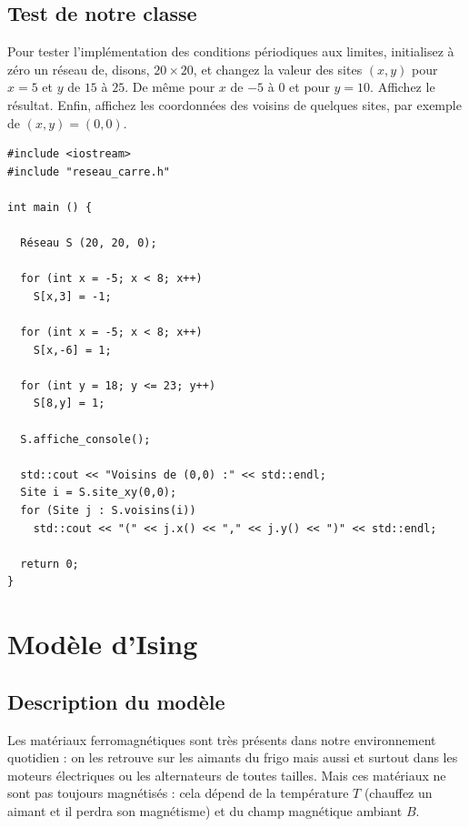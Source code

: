 \documentclass{book}
\begin{document}
\subsection{Test de notre classe}

Pour tester l'implémentation des conditions périodiques aux limites, initialisez à zéro un réseau de, disons, $20\times 20$, et changez la valeur des sites $(x,y)$ pour $x=5$ et $y$ de $15$ à $25$. De même pour $x$ de $-5$ à $0$ et pour $y=10$. Affichez le résultat. Enfin, affichez les coordonnées des voisins de quelques sites, par exemple de $(x,y)=(0,0)$.

\begin{correction}
\begin{verbatim}
#include <iostream>
#include "reseau_carre.h"

int main () {

  Réseau S (20, 20, 0);

  for (int x = -5; x < 8; x++) 
    S[x,3] = -1;

  for (int x = -5; x < 8; x++) 
    S[x,-6] = 1;
  
  for (int y = 18; y <= 23; y++) 
    S[8,y] = 1;
  
  S.affiche_console();

  std::cout << "Voisins de (0,0) :" << std::endl;
  Site i = S.site_xy(0,0);
  for (Site j : S.voisins(i))
    std::cout << "(" << j.x() << "," << j.y() << ")" << std::endl;

  return 0;
}
\end{verbatim}
\end{correction}

\section{Modèle d'Ising}

\subsection{Description du modèle}

Les matériaux ferromagnétiques sont très présents dans notre environnement quotidien : on les retrouve sur les aimants du frigo mais aussi et surtout dans les moteurs électriques ou les alternateurs de toutes tailles. Mais ces matériaux ne sont pas toujours magnétisés : cela dépend de la température $T$ (chauffez un aimant et il perdra son magnétisme) et du champ magnétique ambiant $B$.\\
\end{document}
